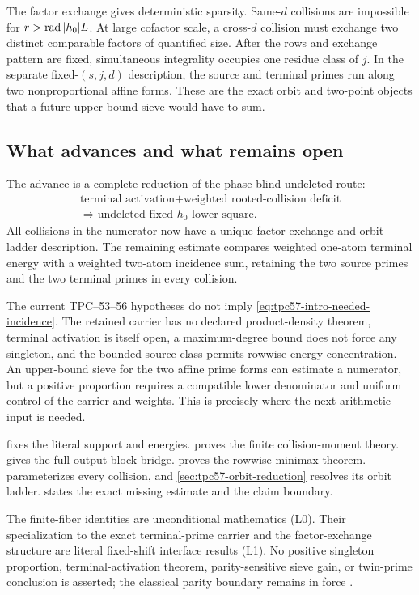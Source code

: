 The factor exchange gives deterministic sparsity.  Same-\(d\) collisions
are impossible for \(r>\operatorname{rad}|h_0|L\).  At large cofactor scale, a
cross-\(d\) collision must exchange two distinct comparable factors of
quantified size.  After the rows and exchange pattern are fixed,
simultaneous integrality occupies one residue class of \(j\).  In the
separate fixed-\((s,j,d)\) description, the source and terminal primes run
along two nonproportional affine forms.  These are the exact orbit and
two-point objects that a future upper-bound sieve would have to sum.

\subsection{What advances and what remains open}

The advance is a complete reduction of the phase-blind undeleted route:
\[
 \begin{gathered}
 \text{terminal activation}
 +\text{weighted rooted-collision deficit}
 \\
 \Longrightarrow
 \text{undeleted fixed-\(h_0\) lower square}.
 \end{gathered}
\]
All collisions in the numerator now have a unique factor-exchange and
orbit-ladder description.  The remaining estimate compares weighted
one-atom terminal energy with a weighted two-atom incidence sum, retaining
the two source primes and the two terminal primes in every collision.

The current TPC--53--56 hypotheses do not imply
\eqref{eq:tpc57-intro-needed-incidence}.  The retained carrier has no
declared product-density theorem, terminal activation is itself open, a
maximum-degree bound does not force any singleton, and the bounded source
class permits rowwise energy concentration.  An upper-bound sieve for the
two affine prime forms can estimate a numerator, but a positive proportion
requires a compatible lower denominator and uniform control of the carrier
and weights.  This is precisely where the next arithmetic input is needed.

 fixes the literal support and energies.
 proves the finite collision-moment
theory.   gives the full-output block bridge.
 proves the rowwise minimax theorem.
 parameterizes every collision, and
\cref{sec:tpc57-orbit-reduction} resolves its orbit ladder.
 states the exact missing estimate and the
claim boundary.

The finite-fiber identities are unconditional mathematics (L0).  Their
specialization to the exact terminal-prime carrier and the factor-exchange
structure are literal fixed-shift interface results (L1).  No positive
singleton proportion, terminal-activation theorem, parity-sensitive sieve
gain, or twin-prime conclusion is asserted; the classical parity boundary
remains in force \citep{FriedlanderIwaniec2010}.
